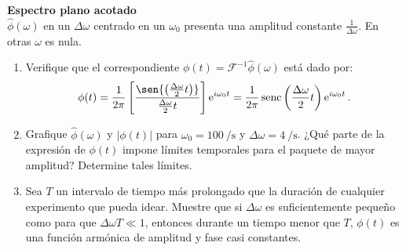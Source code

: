 
\item
\textbf{Espectro plano acotado}\\ 
\(\hat{\phi }(\omega)\) en un $\Delta\omega$ centrado en un $\omega_0$ presenta una amplitud constante $\frac{1}{\Delta \omega}$. 
En otras $\omega$ es nula.
\begin{enumerate}
	\item
	Verifique que el correspondiente $\phi(t) = \mathcal{F}^{-1} \hat{\phi }(\omega)$ está dado por:
	$$
		\phi(t)
		= \frac{1}{2 \pi} \left[ \frac{ \sen{ \left( \frac{\Delta \omega}{2} t \right) } }{\frac{\Delta \omega}{2} t} \right] \operatorname{e}^{i \omega_0 t}
		= \frac{1}{2 \pi} \operatorname{senc} \left( \frac{\Delta \omega}{2} t \right) \operatorname{e}^{i \omega_0 t}.
	$$
	\item
	Grafique $\hat{\phi }(\omega)$ y $\left|\phi(t)\right|$ para $\omega_0 = \SI{100}{\per\second}$ y $\Delta \omega = \SI{4}{\per\second}$.
	¿Qué parte de la expresión de $\phi(t)$ impone límites temporales para el paquete de mayor amplitud?
	Determine tales límites.
	\item 
	Sea $T$ un intervalo de tiempo más prolongado que la duración de cualquier experimento que pueda idear.
	Muestre que si $\Delta \omega$ es suficientemente pequeño como para que $\Delta \omega T \ll 1$, entonces durante un tiempo menor que $T$, $\phi(t)$ es una función armónica de amplitud y fase casi constantes.
\end{enumerate}



